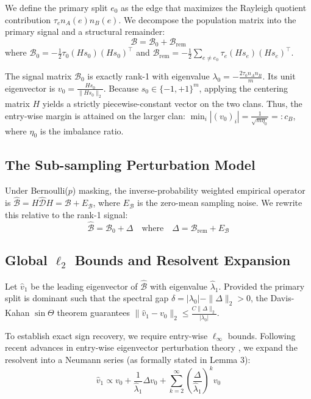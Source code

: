 We define the primary split $e_0$ as the edge that maximizes the Rayleigh quotient contribution $\tau_e n_A(e) n_B(e)$. We decompose the population matrix into the primary signal and a structural remainder:
\begin{equation}
\mathcal{B} = \mathcal{B}_0 + \mathcal{B}_{\text{rem}}
\end{equation}
where $\mathcal{B}_0 = -\frac{1}{2} \tau_0 (H s_0)(H s_0)^\top$ and $\mathcal{B}_{\text{rem}} = -\frac{1}{2} \sum_{e \neq e_0} \tau_e (H s_e)(H s_e)^\top$.

The signal matrix $\mathcal{B}_0$ is exactly rank-1 with eigenvalue $\lambda_0 = -\frac{2 \tau_0 n_A n_B}{m}$. Its unit eigenvector is $v_0 = \frac{H s_0}{\|H s_0\|_2}$. Because $s_0 \in \{-1, +1\}^m$, applying the centering matrix $H$ yields a strictly piecewise-constant vector on the two clans. Thus, the entry-wise margin is attained on the larger clan: $\min_i |(v_0)_i| = \frac{1}{\sqrt{m \eta_0}} =: c_B$, where $\eta_0$ is the imbalance ratio.

\subsection{The Sub-sampling Perturbation Model}

Under Bernoulli($p$) masking, the inverse-probability weighted empirical operator is $\hat{\mathcal{B}} = H \hat{\mathcal{D}} H = \mathcal{B} + E_{\mathcal{B}}$, where $E_{\mathcal{B}}$ is the zero-mean sampling noise. We rewrite this relative to the rank-1 signal:
\begin{equation}
\hat{\mathcal{B}} = \mathcal{B}_0 + \Delta \quad \text{where} \quad \Delta = \mathcal{B}_{\text{rem}} + E_{\mathcal{B}}
\end{equation}

\subsection{Global $\ell_2$ Bounds and Resolvent Expansion}

Let $\hat{v}_1$ be the leading eigenvector of $\hat{\mathcal{B}}$ with eigenvalue $\hat{\lambda}_1$. Provided the primary split is dominant such that the spectral gap $\delta = |\lambda_0| - \|\Delta\|_2 > 0$, the Davis-Kahan $\sin \Theta$ theorem \cite{davis1970rotation} guarantees $\|\hat{v}_1 - v_0\|_2 \le \frac{C \|\Delta\|_2}{|\lambda_0|}$.

To establish exact sign recovery, we require entry-wise $\ell_\infty$ bounds. Following recent advances in entry-wise eigenvector perturbation theory \cite{eldridge2018unperturbed, fan2018eigenvector, abbe2020entrywise}, we expand the resolvent into a Neumann series (as formally stated in Lemma 3):
\begin{equation}
\hat{v}_1 \propto v_0 + \frac{1}{\hat{\lambda}_1} \Delta v_0 + \sum_{k=2}^{\infty} \left(\frac{\Delta}{\hat{\lambda}_1}\right)^k v_0
\end{equation}

